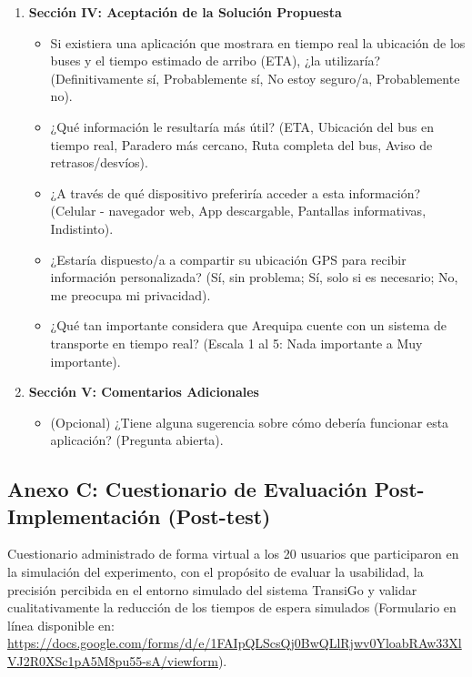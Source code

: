 \begin{enumerate}
    \item \textbf{Sección IV: Aceptación de la Solución Propuesta}
    \begin{itemize}
        \item Si existiera una aplicación que mostrara en tiempo real la ubicación de los buses y el tiempo estimado de arribo (ETA), ¿la utilizaría? (Definitivamente sí, Probablemente sí, No estoy seguro/a, Probablemente no).
        \item ¿Qué información le resultaría más útil? (ETA, Ubicación del bus en tiempo real, Paradero más cercano, Ruta completa del bus, Aviso de retrasos/desvíos).
        \item ¿A través de qué dispositivo preferiría acceder a esta información? (Celular - navegador web, App descargable, Pantallas informativas, Indistinto).
        \item ¿Estaría dispuesto/a a compartir su ubicación GPS para recibir información personalizada? (Sí, sin problema; Sí, solo si es necesario; No, me preocupa mi privacidad).
        \item ¿Qué tan importante considera que Arequipa cuente con un sistema de transporte en tiempo real? (Escala 1 al 5: Nada importante a Muy importante).
    \end{itemize}
    
    \item \textbf{Sección V: Comentarios Adicionales}
    \begin{itemize}
        \item (Opcional) ¿Tiene alguna sugerencia sobre cómo debería funcionar esta aplicación? (Pregunta abierta).
    \end{itemize}
\end{enumerate}

\subsection*{Anexo C: Cuestionario de Evaluación Post-Implementación (Post-test)}

Cuestionario administrado de forma virtual a los 20 usuarios que participaron en la simulación del experimento, con el propósito de evaluar la usabilidad, la precisión percibida en el entorno simulado del sistema TransiGo y validar cualitativamente la reducción de los tiempos de espera simulados (Formulario en línea disponible en: \url{https://docs.google.com/forms/d/e/1FAIpQLScsQj0BwQLlRjwv0YloabRAw33XlVJ2R0XSc1pA5M8pu55-sA/viewform}).

